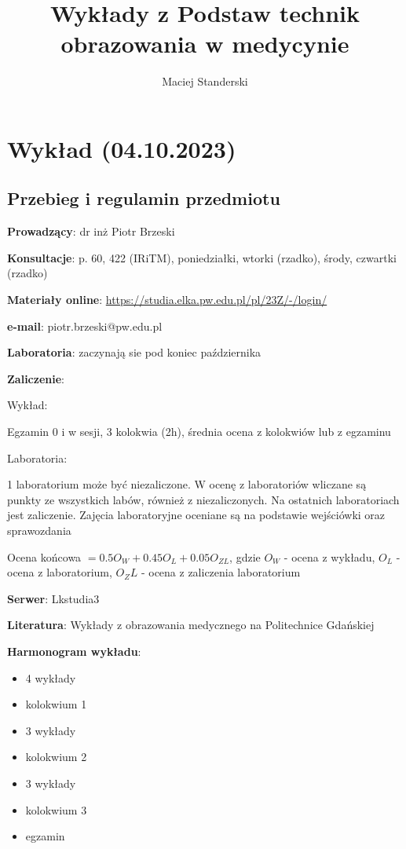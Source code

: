 \documentclass{article}
\title{Wykłady z Podstaw technik obrazowania w medycynie}
\author{Maciej Standerski}
\begin{document}
\maketitle

\section{Wykład (04.10.2023)}
\subsection{Przebieg i regulamin przedmiotu}

\textbf{Prowadzący}: dr inż Piotr Brzeski

\textbf{Konsultacje}: p. 60, 422 (IRiTM), poniedziałki, wtorki (rzadko), środy, czwartki (rzadko)

\textbf{Materiały online}: \href{https://studia.elka.pw.edu.pl/pl/23Z/-/login/}{https:\slash \slash studia.elka.pw.edu.pl\slash pl\slash 23Z\slash-\slash login\slash}

\textbf{e-mail}: piotr.brzeski@pw.edu.pl

\textbf{Laboratoria}: zaczynają sie pod koniec października

\textbf{Zaliczenie}:

Wykład:

Egzamin 0 i w sesji, 3 kolokwia (2h), średnia ocena z kolokwiów lub z egzaminu

Laboratoria:

1 laboratorium może być niezaliczone. W ocenę z laboratoriów wliczane są punkty ze wszystkich labów, również z niezaliczonych. Na ostatnich laboratoriach jest zaliczenie. Zajęcia laboratoryjne oceniane są na podstawie wejściówki oraz sprawozdania

Ocena końcowa $ = 0.5 O_W + 0.45 O_L + 0.05 O_{ZL}$, gdzie $O_W$ - ocena z wykładu, $O_L$ - ocena z laboratorium, $O_ZL$ - ocena z zaliczenia laboratorium

\textbf{Serwer}: Lkstudia3

\textbf{Literatura}: Wykłady z obrazowania medycznego na Politechnice Gdańskiej

\textbf{Harmonogram wykładu}:
\begin{itemize}
    \item 4 wykłady
    \item kolokwium 1
    \item 3 wykłady
    \item kolokwium 2
    \item 3 wykłady
    \item kolokwium 3
    \item egzamin
\end{itemize}
\end{document}
